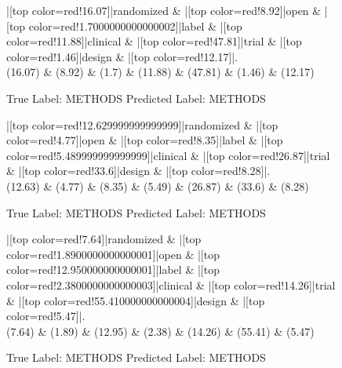 \documentclass[a4paper, landscape]{article}
\begin{document}
\clearpage
\begin{figure}
\begin{center}
\begin{dependency}
\begin{deptext}
|[top color=red!16.07]|randomized \& |[top color=red!8.92]|open \& |[top color=red!1.7000000000000002]|label \& |[top color=red!11.88]|clinical \& |[top color=red!47.81]|trial \& |[top color=red!1.46]|design \& |[top color=red!12.17]|.\\
(16.07) \& (8.92) \& (1.7) \& (11.88) \& (47.81) \& (1.46) \& (12.17)\\
\end{deptext}
\end{dependency}
\end{center}
\caption{True Label: METHODS Predicted Label: METHODS}
\end{figure}
\clearpage
\begin{figure}
\begin{center}
\begin{dependency}
\begin{deptext}
|[top color=red!12.629999999999999]|randomized \& |[top color=red!4.77]|open \& |[top color=red!8.35]|label \& |[top color=red!5.489999999999999]|clinical \& |[top color=red!26.87]|trial \& |[top color=red!33.6]|design \& |[top color=red!8.28]|.\\
(12.63) \& (4.77) \& (8.35) \& (5.49) \& (26.87) \& (33.6) \& (8.28)\\
\end{deptext}
\end{dependency}
\end{center}
\caption{True Label: METHODS Predicted Label: METHODS}
\end{figure}
\clearpage
\begin{figure}
\begin{center}
\begin{dependency}
\begin{deptext}
|[top color=red!7.64]|randomized \& |[top color=red!1.8900000000000001]|open \& |[top color=red!12.950000000000001]|label \& |[top color=red!2.3800000000000003]|clinical \& |[top color=red!14.26]|trial \& |[top color=red!55.410000000000004]|design \& |[top color=red!5.47]|.\\
(7.64) \& (1.89) \& (12.95) \& (2.38) \& (14.26) \& (55.41) \& (5.47)\\
\end{deptext}
\end{dependency}
\end{center}
\caption{True Label: METHODS Predicted Label: METHODS}
\end{figure}
\end{document}
